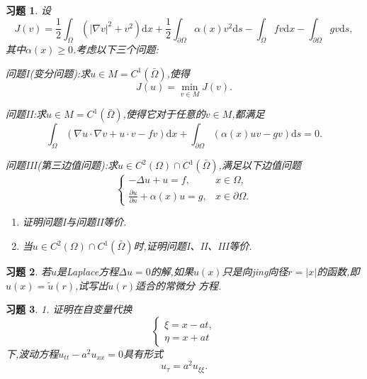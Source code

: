 \documentclass[a4paper,oneside,12pt]{ctexart}
\theoremstyle{plain}
\newtheorem{exercise}{习题}[section]
\theoremstyle{nonumberplain}
\theoremstyle{nonumberplain}
\newcommand{\dif}{\mathrm{d}}
\newcommand{\ptl}{\partial}
\newcommand{\abs}[1]{\left\vert#1\right\vert}
\begin{document}
    \begin{exercise}
        \label{ex:1.3}
        设
        \begin{equation*}
            J(v)=\frac{1}{2}\int_\Omega(\abs{\nabla v}^2+v^2)\dif x+\frac{1}{2}\int_{\ptl\Omega}\alpha(x)v^2\dif s-\int_\Omega fv\dif x-\int_{\ptl\Omega}gv\dif s,
        \end{equation*}
        其中$\alpha(x)\geqslant 0$.考虑以下三个问题:
        
        问题I(变分问题):求$u\in M=C^1(\bar{\Omega})$,使得
        \begin{equation*}
            J(u)=\min_{v\in M}J(v).
        \end{equation*}

        问题II:求$u\in M=C^1(\bar{\Omega})$,使得它对于任意的$v\in M$,都满足
        \begin{equation*}
            \int_\Omega(\nabla u\cdot\nabla v+u\cdot v-fv)\dif x+\int_{\ptl\Omega}(\alpha(x)uv-gv)\dif s=0.
        \end{equation*}
        
        问题III(第三边值问题):求$u\in C^2(\Omega)\cap C^1(\bar{\Omega})$,满足以下边值问题
        \begin{equation*}
            \begin{cases}
                -\Delta u+u=f,&x\in\Omega,\\
                \frac{\ptl u}{\ptl n}+\alpha(x)u=g,&x\in\ptl\Omega.
            \end{cases}
        \end{equation*}

        \begin{enumerate}
            \item 证明问题I与问题II等价.
            \item 当$u\in C^2(\Omega)\cap C^1(\bar{\Omega})$时,证明问题I、II、III等价.
        \end{enumerate}
    \end{exercise}

    \begin{exercise}
        \label{1.4}
        若$u$是Laplace方程$\Delta u=0$的解,如果$u(x)$只是向jing向径$r=\abs{x}$的函数,即$u(x)=\tilde{u}(r)$,试写出$\tilde{u}(r)$适合的常微分
        方程.
    \end{exercise}

    \begin{exercise}
        \label{ex:1.5}
        1. 证明在自变量代换
        \begin{equation*}
            \begin{cases}
                \xi=x-at,\\
                \eta=x+at
            \end{cases}
        \end{equation*}
        下,波动方程$u_{tt}-a^2u_{xx}=0$具有形式
        \begin{equation*}
            u_\tau=a^2u_{\xi\xi}.
        \end{equation*}
    \end{exercise}
\end{document}
